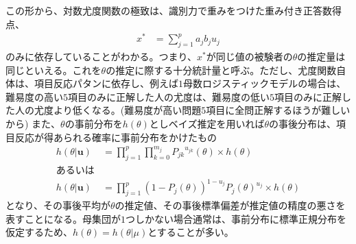 \documentclass[12pt]{jarticle}
\begin{document}
この形から、対数尤度関数の極致は、識別力で重みをつけた重み付き正答数得点、
\begin{align}
  \label{06}
  \displaystyle x^{\ast} &= \sum_{j = 1}^{p} a_j b_j u_j \tag{8}
\end{align}
のみに依存していることがわかる。つまり、$x^{\ast}$が同じ値の被験者の$\theta$の推定量は同じといえる。これを$\theta$の推定に際する十分統計量と呼ぶ。ただし、尤度関数自体は、項目反応パタンに依存し、例えば$1$母数ロジスティックモデルの場合は、難易度の高い$5$項目のみに正解した人の尤度は、難易度の低い$5$項目のみに正解した人の尤度より低くなる。(難易度が高い問題$5$項目に全問正解するほうが難しいから)
また、$\theta$の事前分布を$h(\theta)$としベイズ推定を用いれば$\theta$の事後分布は、項目反応が得あられる確率に事前分布をかけたもの
\begin{align*}
  \label{07}
  \displaystyle h(\theta|\boldsymbol{u})&=\prod_{j = 1}^{p} \prod_{k = 0}^{m_j} {P_{jk}}^{u_{jk}}(\theta)\times h(\theta)\\
  あるいは\\
  h(\theta|\boldsymbol{u}) &= \prod_{j = 1}^{p} (1 - P_j(\theta))^{1 - u_j}P_j(\theta)^{u_j} \times h(\theta) \tag{9}
\end{align*}
となり、その事後平均が$\theta$の推定値、その事後標準偏差が推定値の精度の悪さを表すことになる。母集団が$1$つしかない場合通常は、事前分布に標準正規分布を仮定するため、$h(\theta) = h(\theta|\mu)$とすることが多い。
\end{document}
